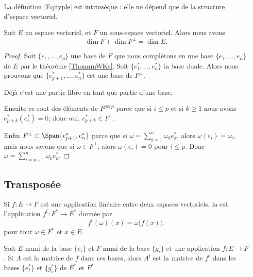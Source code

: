 La définition \eqref{Eqiiyple} est intrinsèque : elle ne dépend que de la structure d'espace vectoriel.

\begin{proposition} \label{PropXrTDIi}
    Soit \( E\) un espace vectoriel, et \( F\) un sous-espace vectoriel. Alors nous avons
    \begin{equation}
        \dim F+\dim F^{\perp}=\dim E.
    \end{equation}
\end{proposition}

\begin{proof}
    Soit \( \{ e_1,\ldots, e_p \}\) une base de \( F\) que nous complétons en une base \( \{ e_1,\ldots, e_n \}\) de \( E\) par le théorème \ref{ThonmnWKs}. Soit \( \{ e_1^*,\ldots, e^*_n \}\) la base duale. Alors nous prouvons que \( \{ e^*_{p+1},\ldots, e_n^* \}\) est une base de \( F^{\perp}\). 
    
    Déjà c'est une partie libre en tant que partie d'une base.

    Ensuite ce sont des éléments de \( F^{perp}\) parce que si \( i\leq p\) et si \( k\geq 1\) nous avons \( e^*_{p+k}(e_i^*)=0\); donc oui, \( e^*_{p+k}\in F^{\perp}\).

    Enfin \( F^{\perp}\subset\Span\{ e_{p+1}^*,e_n^* \}\) parce que si \( \omega=\sum_{k=1}^n\omega_ke_k^*\), alors \( \omega(e_i)=\omega_i\), mais nous savons que si \( \omega\in F^{\perp}\), alors \( \omega(e_i)=0\) pour \( i\leq p\). Donc \( \omega=\sum_{i=p+1}^n\omega_ke^*_k\).
\end{proof}

\subsection{Transposée}

Si \( f\colon E\to F\) est une application linéaire entre deux espaces vectoriels, la  est l'application \( f^t\colon F^*\to E^*\) donnée par
\begin{equation}
    f^t(\omega)(x)=\omega\big( f(x) \big).
\end{equation}
pour tout \( \omega\in F^*\) et \( x\in E\).

\begin{lemma}
    Soit \( E\) muni de la base \( \{ e_i \}\) et \( F\) muni de la base \( \{ g_i \}\) et une application \( f\colon E\to F\). Si \( A\) est la matrice de \( f\) dans ces bases, alors \( A^t\) est la matrice de \( f^t\) dans les bases \( \{ e^*_i \}\) et \( \{ g^*_i \}\) de \( E^*\) et \( F^*\).
\end{lemma}

